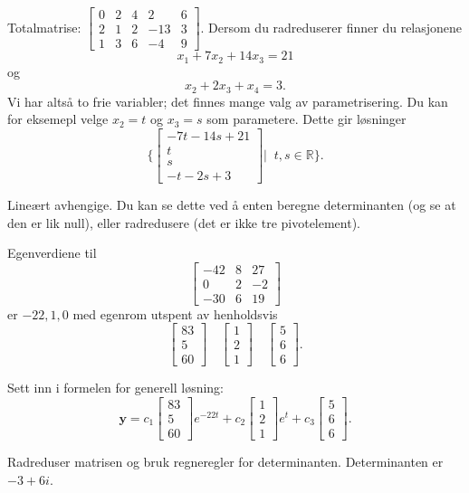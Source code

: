 \documentclass[titlepage,a4paper,12pt,norsk]{IMFeksamen}
\newcommand{\V}[1]{\mathbf{#1}}
\newcommand{\vvv}[3]{\begin{bmatrix} #1 \\ #2 \\ #3 \end{bmatrix}}
\newcommand{\vvvv}[4]{\begin{bmatrix} #1 \\ #2 \\ #3 \\ #4 \end{bmatrix}}
\newcommand{\0}{\V{0}}
\begin{document}
\begin{oppgave}
Totalmatrise:
$
\begin{bmatrix}
0 & 2 & 4 &   2 & 6 \\
2 & 1 & 2 & -13 & 3 \\
1 & 3 & 6 &  -4 & 9
\end{bmatrix}
$.
Dersom du radreduserer finner du relasjonene
$$x_1+7x_2+14x_3=21$$
og $$x_2+2x_3+x_4=3.$$
Vi har altså to frie variabler; det finnes mange valg av parametrisering. Du kan for eksemepl velge $x_2=t$ og $x_3=s$ som parametere. Dette gir løsninger
$$\{\vvvv{-7t-14s+21}{t}{s}{-t-2s+3}|\;\; t,s \in \mathbb{R}\}.$$
\end{oppgave}


\begin{oppgave}
Lineært avhengige. Du kan se dette ved å enten beregne determinanten (og se at den er lik null), eller radredusere (det er ikke tre pivotelement).
\end{oppgave}


\begin{oppgave}
Egenverdiene til
\[
\begin{bmatrix}
-42 & 8 & 27 \\
  0 & 2 & -2 \\
-30 & 6 & 19
\end{bmatrix}
\]
er $-22,1,0$ med egenrom utspent av henholdsvis 
$$\vvv{83}{5}{60} \quad \vvv{1}{2}{1} \quad \vvv{5}{6}{6}.$$

Sett inn i formelen for generell løsning:
$$\V{y} = c_1\vvv{83}{5}{60}e^{-22t}+c_2\vvv{1}{2}{1}e^{t}+c_3 \vvv{5}{6}{6}.$$
\end{oppgave}


\begin{oppgave}
Radreduser matrisen og bruk regneregler for determinanten. Determinanten er $-3+6i$.
\end{oppgave}
\end{document}
